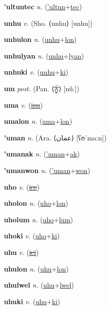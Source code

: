 \textbf{\hypertarget{'ultuntec}{'ultuntec}} \textit{n.} (\hyperlink{'ultun}{'ultun}+\allowbreak \hyperlink{tec}{tec})


\textbf{\hypertarget{unhu}{unhu}} \textit{v.} (Sho. ⟨unhu⟩ [unhu])


\textbf{\hypertarget{unhulon}{unhulon}} \textit{n.} (\hyperlink{unhu}{unhu}+\allowbreak \hyperlink{lon}{lon})


\textbf{\hypertarget{unhulyan}{unhulyan}} \textit{n.} (\hyperlink{unhu}{unhu}+\allowbreak \hyperlink{lyan}{lyan})


\textbf{\hypertarget{unhuki}{unhuki}} \textit{v.} (\hyperlink{unhu}{unhu}+\allowbreak \hyperlink{ki}{ki})


\textbf{\hypertarget{um}{um}} \textit{post.} (Pan. ⟨{\gurmukhi{}ਨੂੰ}⟩ [nũː])


\textbf{\hypertarget{uma}{uma}} \textit{v.} (\hyperlink{ipa}{\sout{ipa}})


\textbf{\hypertarget{umalon}{umalon}} \textit{n.} (\hyperlink{uma}{uma}+\allowbreak \hyperlink{lon}{lon})


\textbf{\hypertarget{'uman}{'uman}} \textit{n.} (Ara. ⟨{\arabics{}عمان‎}⟩ [ʕʊˈmaːn])


\textbf{\hypertarget{'umanak}{'umanak}} \textit{n.} (\hyperlink{'uman}{'uman}+\allowbreak \hyperlink{ak}{ak})


\textbf{\hypertarget{'umanwon}{'umanwon}} \textit{n.} (\hyperlink{'uman}{'uman}+\allowbreak \hyperlink{won}{won})


\textbf{\hypertarget{uho}{uho}} \textit{v.} (\hyperlink{ice}{\sout{ice}})


\textbf{\hypertarget{uholon}{uholon}} \textit{n.} (\hyperlink{uho}{uho}+\allowbreak \hyperlink{lon}{lon})


\textbf{\hypertarget{uholum}{uholum}} \textit{n.} (\hyperlink{uho}{uho}+\allowbreak \hyperlink{lum}{lum})


\textbf{\hypertarget{uhoki}{uhoki}} \textit{v.} (\hyperlink{uho}{uho}+\allowbreak \hyperlink{ki}{ki})


\textbf{\hypertarget{uhu}{uhu}} \textit{v.} (\hyperlink{ici}{\sout{ici}})


\textbf{\hypertarget{uhulon}{uhulon}} \textit{n.} (\hyperlink{uhu}{uhu}+\allowbreak \hyperlink{lon}{lon})


\textbf{\hypertarget{uhulwel}{uhulwel}} \textit{n.} (\hyperlink{uhu}{uhu}+\allowbreak \hyperlink{lwel}{lwel})


\textbf{\hypertarget{uhuki}{uhuki}} \textit{v.} (\hyperlink{uhu}{uhu}+\allowbreak \hyperlink{ki}{ki})


